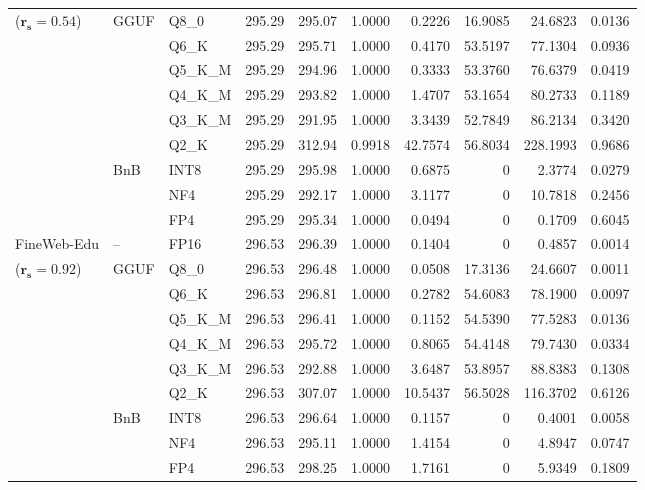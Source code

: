 \begin{longtable}{ll l rrrrrrr}
{\small ($\mathbf{r_s{=}0.54}$)} & GGUF & Q8\_0 & 295.29 & 295.07 & 1.0000 & 0.2226 & 16.9085 & 24.6823 & 0.0136 \\
 &  & Q6\_K & 295.29 & 295.71 & 1.0000 & 0.4170 & 53.5197 & 77.1304 & 0.0936 \\
 &  & Q5\_K\_M & 295.29 & 294.96 & 1.0000 & 0.3333 & 53.3760 & 76.6379 & 0.0419 \\
 &  & Q4\_K\_M & 295.29 & 293.82 & 1.0000 & 1.4707 & 53.1654 & 80.2733 & 0.1189 \\
 &  & Q3\_K\_M & 295.29 & 291.95 & 1.0000 & 3.3439 & 52.7849 & 86.2134 & 0.3420 \\
 &  & Q2\_K & 295.29 & 312.94 & 0.9918 & 42.7574 & 56.8034 & 228.1993 & 0.9686 \\
 & BnB & INT8 & 295.29 & 295.98 & 1.0000 & 0.6875 & \cellcolor{cyan!12} $0$ & 2.3774 & 0.0279 \\
 &  & NF4 & 295.29 & 292.17 & 1.0000 & 3.1177 & \cellcolor{cyan!12} $0$ & 10.7818 & 0.2456 \\
 &  & FP4 & 295.29 & 295.34 & 1.0000 & 0.0494 & \cellcolor{cyan!12} $0$ & 0.1709 & 0.6045 \\
\midrule
FineWeb-Edu & -- & FP16 & 296.53 & 296.39 & 1.0000 & 0.1404 & \cellcolor{cyan!12} $0$ & 0.4857 & 0.0014 \\
{\small ($\mathbf{r_s{=}0.92}$)} & GGUF & Q8\_0 & 296.53 & 296.48 & 1.0000 & 0.0508 & 17.3136 & 24.6607 & 0.0011 \\
 &  & Q6\_K & 296.53 & 296.81 & 1.0000 & 0.2782 & 54.6083 & 78.1900 & 0.0097 \\
 &  & Q5\_K\_M & 296.53 & 296.41 & 1.0000 & 0.1152 & 54.5390 & 77.5283 & 0.0136 \\
 &  & Q4\_K\_M & 296.53 & 295.72 & 1.0000 & 0.8065 & 54.4148 & 79.7430 & 0.0334 \\
 &  & Q3\_K\_M & 296.53 & 292.88 & 1.0000 & 3.6487 & 53.8957 & 88.8383 & 0.1308 \\
 &  & Q2\_K & 296.53 & 307.07 & 1.0000 & 10.5437 & 56.5028 & 116.3702 & 0.6126 \\
 & BnB & INT8 & 296.53 & 296.64 & 1.0000 & 0.1157 & \cellcolor{cyan!12} $0$ & 0.4001 & 0.0058 \\
 &  & NF4 & 296.53 & 295.11 & 1.0000 & 1.4154 & \cellcolor{cyan!12} $0$ & 4.8947 & 0.0747 \\
 &  & FP4 & 296.53 & 298.25 & 1.0000 & 1.7161 & \cellcolor{cyan!12} $0$ & 5.9349 & 0.1809 \\
\end{longtable}
\endgroup
